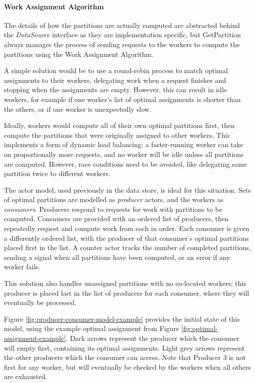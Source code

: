 \paragraph{Work Assignment Algorithm} %
The details of how the partitions are actually computed are abstracted behind the \textit{DataSource} interface as they are implementation specific, but GetPartition always manages the process of sending requests to the workers to compute the partitions using the Work Assignment Algorithm. 

A simple solution would be to use a round-robin process to match optimal assignments to their workers, delegating work when a request finishes and stopping when the assignments are empty. However, this can result in idle workers, for example if one worker's list of optimal assignments is shorter than the others, or if one worker is unexpectedly slow.

Ideally, workers would compute all of their own optimal partitions first, then compute the partitions that were originally assigned to other workers. This implements a form of dynamic load balancing: a faster-running worker can take on proportionally more requests, and no worker will be idle unless all partitions are computed. However, race conditions need to be avoided, like delegating same partition twice to different workers.

The actor model, used previously in the data store, is ideal for this situation. Sets of optimal partitions are modelled as \textit{producer} actors, and the workers as \textit{consumers}. Producers respond to requests for work with partitions to be computed. Consumers are provided with an ordered list of producers, then repeatedly request and compute work from each in order. Each consumer is given a differently ordered list, with the producer of that consumer's optimal partitions placed first in the list. A counter actor tracks the number of completed partitions, sending a signal when all partitions have been computed, or an error if any worker fails.

This solution also handles unassigned partitions with no co-located workers; this producer is placed last in the list of producers for each consumer, where they will eventually be processed.

Figure \ref{fig:producer-consumer-model-example} provides the initial state of this model, using the example optimal assignment from Figure \ref{fig:optimal-assignment-example}. Dark arrows represent the producer which the consumer will empty first, containing its optimal assignments. Light grey arrows represent the other producers which the consumer can access. Note that Producer 3 is not first for any worker, but will eventually be checked by the workers when all others are exhausted.

